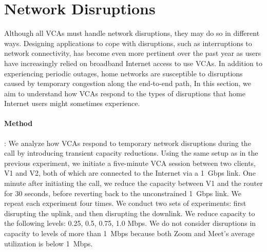 \section{Network Disruptions}
\label{sec:interruption}

Although all VCAs must handle network disruptions,  they may 
do so in different ways.
Designing applications to cope with disruptions, such as interruptions to network
connectivity, has become even more pertinent over the past year as users have
increasingly relied on broadband Internet access to use VCAs.
In addition to experiencing periodic outages, home networks are susceptible to disruptions caused by temporary congestion along the end-to-end path, 
In this section, we aim to understand how VCAs respond to the types of disruptions that home Internet users might sometimes experience.


\paragraph{Method}:
We analyze how
VCAs respond to temporary network disruptions during the call by introducing
transient capacity reductions. Using the same setup as in
the previous experiment, we initiate a five-minute VCA session between
two clients, V1 and V2, both of which are connected to the Internet via a
1~Gbps link. One minute after initiating the call, we reduce the capacity
between V1 and the router for 30 seconds, before reverting back to the
unconstrained 1~Gbps link. We repeat each experiment four times.
We conduct two sets of experiments: first disrupting the uplink, and then
disrupting the downlink. We reduce capacity to the following
levels: {0.25, 0.5, 0.75, 1.0} Mbps. We do not consider disruptions in capacity
to levels of more than 1~Mbps because both Zoom and Meet's average utilization
is below 1~Mbps.

